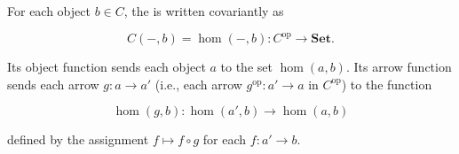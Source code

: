 For each object $b \in C$, the  is written covariantly as

$$
C(-, b) = \hom(-, b): C^{\text{op}} \to \mathbf{Set}.
$$

Its object function sends each object $a$ to the set $\hom(a, b)$. Its arrow function sends each arrow $g: a \to a'$ (i.e., each arrow $g^{\text{op}}: a' \to a$ in $C^{\text{op}}$) to the function

$$
\hom(g, b): \hom(a', b) \to \hom(a, b)
$$

defined by the assignment $f \mapsto f \circ g$ for each $f: a' \to b$.

